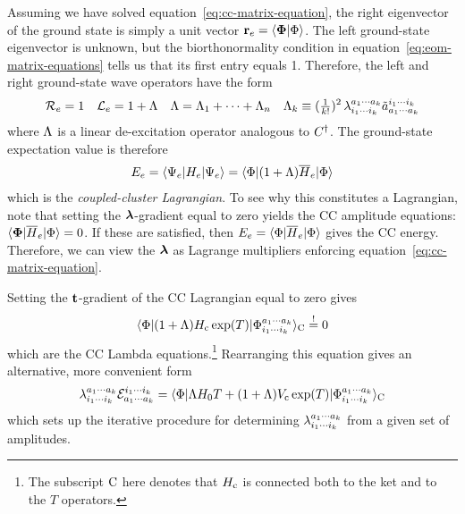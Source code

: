 \documentclass[11pt]{article}
\numberwithin{equation}{section}
\begin{document}
\begin{dfn}
Assuming we have solved equation~\ref{eq:cc-matrix-equation}, the right eigenvector of the ground state is simply a unit vector
$
  \mathbf{r}_e
=
  \langle\mathbf{\Phi }|\Phi \rangle
$.
The left ground-state eigenvector is unknown, but the biorthonormality condition in equation~\ref{eq:eom-matrix-equations} tells us that its first entry equals 1.
Therefore, the left and right ground-state wave operators have the form
\begin{align}
\label{eq:cc-ground-state-wave-operators}
  \mathcal{R}_e
=
  1
&&
  \mathcal{L}_e
=
  1
+
  \Lambda 
&&
  \Lambda 
=
  \Lambda _1
+
  \cdots
+
  \Lambda _n
&&
  \Lambda _k
\equiv
  (\tfrac{1}{k!})^2\,
  \lambda _{i_1\cdots i_k}^{a_1\cdots a_k}
  \tilde{a}^{i_1\cdots i_k}_{a_1\cdots a_k}
\end{align}
where $\Lambda $ is a linear de-excitation operator analogous to $C^\dagger$.
The ground-state expectation value is therefore
\begin{align}
  E_e
=
  \langle\Psi _e|H_e|\Psi _e\rangle
=
  \langle\Phi |
    (
      1
    +
      \Lambda 
    )
    \overline{H}_e
  |\Phi \rangle
\end{align}
which is the \textit{coupled-cluster Lagrangian}.
To see why this constitutes a Lagrangian, note that setting the $\bm{\la}$-gradient equal to zero yields the CC amplitude equations: $\langle\mathbf{\Phi }|\overline{H}_e|\Phi \rangle=0$.
If these are satisfied, then
$
  E_e
=
  \langle\Phi |\overline{H}_e|\Phi \rangle
$
gives the CC energy.
Therefore, we can view the $\bm{\la}$ as Lagrange multipliers enforcing equation~\ref{eq:cc-matrix-equation}.
\end{dfn}


\begin{dfn}
Setting the $\mathbf{t}$-gradient of the CC Lagrangian equal to zero gives
\begin{align}
  \langle\Phi |
  (
    1
  +
    \Lambda 
  )
  H_{\mathrm{c}}\,
  \mathrm{exp}(T)
  |\Phi _{i_1\cdots i_k}^{a_1\cdots a_k}\rangle_{\mathrm{C}}
\overset{!}{=}
  0
\end{align}
which are the CC Lambda equations.\footnote{
The subscript $\mathrm{C}$ here denotes that $H_{\mathrm{c}}$ is connected both to the ket and to the $T$ operators.
}
Rearranging this equation gives an alternative, more convenient form
\begin{align}
  \lambda _{i_1\cdots i_k}^{a_1\cdots a_k}
  \mathcal{E}_{a_1\cdots a_k}^{i_1\cdots i_k}
=
  \langle\Phi |
  \Lambda 
  H_0
  T
  +
  (
    1
  +
    \Lambda 
  )
  V_{\mathrm{c}}\,
  \mathrm{exp}(T)
  |\Phi _{i_1\cdots i_k}^{a_1\cdots a_k}\rangle_{\mathrm{C}}
\end{align}
which sets up the iterative procedure for determining $\lambda _{i_1\cdots i_k}^{a_1\cdots a_k}$ from a given set of amplitudes.
\end{dfn}
\end{document}

